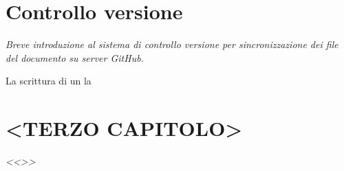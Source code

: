 \documentclass[envcountsame,envcountchap]{svmono}
\begin{document}
    
    

                
                
    

\chapter{Controllo versione} \label{Cap.2}

\vspace{2cm}

\begin{flushright}
\textit{Breve introduzione al sistema di controllo versione per sincronizzazione dei file del documento su server GitHub.}
\end{flushright}

\vspace{0.5cm}

La scrittura di un la








\chapter{<TERZO CAPITOLO>}  \label{Cap.3}

\vspace{2cm}

\begin{flushright}
 \textit{<<>>}
\end{flushright}
\end{document}
